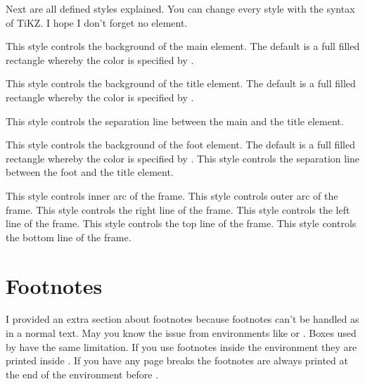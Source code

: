 \documentclass[openany,12pt,tocdepth=3]{ltx-md}
\begin{document}
Next are all defined styles explained. You can change every style with the
syntax of TiKZ.  I hope I don't forget no element.

This style controls the background of the main element. The
default is a full filled rectangle whereby the color
is specified by . 

This style controls the background of the title element. The
default is a full filled rectangle whereby the color
is specified by . 

This style controls the separation line between the main and the title element.

This style controls the background of the foot element. The
default is a full filled rectangle whereby the color
is specified by . 
This style controls the separation line between the foot and the title element.

This style controls inner arc of the frame.
This style controls outer arc of the frame.
This style controls the right line of the frame.
This style controls the left line of the frame.
This style controls the top line of the frame.
This style controls the bottom line of the frame.




\section{Footnotes}\label{sec:footnotes}
I provided an extra section about footnotes because 
footnotes can't be handled as in a normal text. May you
know the issue from environments like  or . 
Boxes used by  have the same limitation. If you use 
footnotes inside the environment  they are printed
inside . If you have any page breaks the footnotes
are always printed at the end of the environment before .
\end{document}
